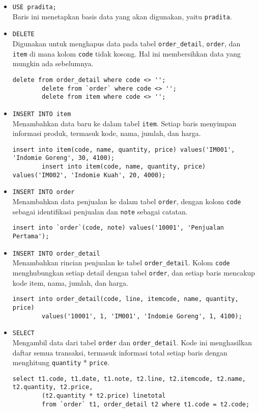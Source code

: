 \begin{itemize}
	\item \texttt{USE pradita;} \\ 
	Baris ini menetapkan basis data yang akan digunakan, yaitu \texttt{pradita}.
	
	\item \texttt{DELETE} \\ 
	Digunakan untuk menghapus data pada tabel \texttt{order\_detail}, \texttt{order}, dan \texttt{item} di mana kolom \texttt{code} tidak kosong. Hal ini membersihkan data yang mungkin ada sebelumnya.
	\begin{lstlisting}[style=JavaStyle]
		delete from order_detail where code <> '';
		delete from `order` where code <> '';
		delete from item where code <> '';
	\end{lstlisting}
	
	\item \texttt{INSERT INTO item} \\ 
	Menambahkan data baru ke dalam tabel \texttt{item}. Setiap baris menyimpan informasi produk, termasuk kode, nama, jumlah, dan harga.
	\begin{lstlisting}[style=JavaStyle]
		insert into item(code, name, quantity, price) values('IM001', 'Indomie Goreng', 30, 4100);
		insert into item(code, name, quantity, price) values('IM002', 'Indomie Kuah', 20, 4000);
	\end{lstlisting}
	
	\item \texttt{INSERT INTO order} \\ 
	Menambahkan data penjualan ke dalam tabel \texttt{order}, dengan kolom \texttt{code} sebagai identifikasi penjualan dan \texttt{note} sebagai catatan.
	\begin{lstlisting}[style=JavaStyle]
		insert into `order`(code, note) values('10001', 'Penjualan Pertama');
	\end{lstlisting}
	
	\item \texttt{INSERT INTO order\_detail} \\ 
	Menambahkan rincian penjualan ke tabel \texttt{order\_detail}. Kolom \texttt{code} menghubungkan setiap detail dengan tabel \texttt{order}, dan setiap baris mencakup kode item, nama, jumlah, dan harga.
	\begin{lstlisting}[style=JavaStyle]
		insert into order_detail(code, line, itemcode, name, quantity, price) 
		values('10001', 1, 'IM001', 'Indomie Goreng', 1, 4100);
	\end{lstlisting}
	
	\item \texttt{SELECT} \\ 
	Mengambil data dari tabel \texttt{order} dan \texttt{order\_detail}. Kode ini menghasilkan daftar semua transaksi, termasuk informasi total setiap baris dengan menghitung \texttt{quantity} * \texttt{price}.
	\begin{lstlisting}[style=JavaStyle]
		select t1.code, t1.date, t1.note, t2.line, t2.itemcode, t2.name, t2.quantity, t2.price, 
		(t2.quantity * t2.price) linetotal
		from `order` t1, order_detail t2 where t1.code = t2.code;
	\end{lstlisting}
\end{itemize}

